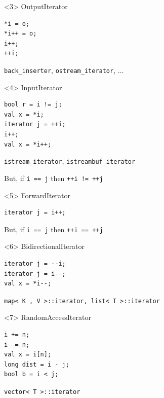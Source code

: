 \documentclass{beamer}
\begin{document}
\begin{frame}[fragile]
\begin{columns}[T]
\begin{column}{0.55\textwidth}
\begin{onlyenv}
      \end{onlyenv}
      \begin{onlyenv}<3>
         OutputIterator
         
         \begin{lstlisting}
*i = o;
*i++ = o;
i++;
++i;
         \end{lstlisting}

         {\tt back\_inserter}, {\tt ostream\_iterator}, ...
      \end{onlyenv}
      \begin{onlyenv}<4>
         InputIterator 
         
         \begin{lstlisting}
bool r = i != j;
val x = *i;
iterator j = ++i;
i++;
val x = *i++;
         \end{lstlisting}
{\tt istream\_iterator}, {\tt istreambuf\_iterator}

          \vspace{2ex}
          But, if {\tt i == j} then {\tt ++i != ++j}
      \end{onlyenv}
      \begin{onlyenv}<5>
         ForwardIterator
         \begin{lstlisting}
iterator j = i++;
         \end{lstlisting}

          \vspace{2ex}
          But, if {\tt i == j} then {\tt ++i == ++j}
      \end{onlyenv}
      \begin{onlyenv}<6>
         BidirectionalIterator
         \begin{lstlisting}
iterator j = --i;
iterator j = i--;
val x = *i--;
         \end{lstlisting}
         {\tt map< K , V >::iterator, list< T >::iterator}
      \end{onlyenv}
      \begin{onlyenv}<7>
         RandomAccessIterator
         \begin{lstlisting}
i += n;
i -= n;
val x = i[n];
long dist = i - j;
bool b = i < j;
         \end{lstlisting}
         {\tt vector< T >::iterator}
      \end{onlyenv}
    \end{column}
  \end{columns}
\end{frame}
\end{document}
